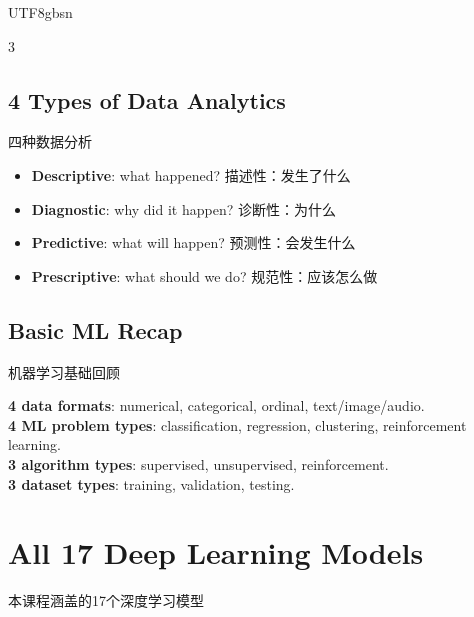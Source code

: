 \documentclass[9pt,landscape,a4paper]{article}
\newcommand{\zhint}[1]{{\scriptsize\color{gray!70!black}#1}}
\begin{document}
\begin{CJK}{UTF8}{gbsn}
\begin{multicols}{3}
\subsection{4 Types of Data Analytics}
\zhint{四种数据分析}
\begin{itemize}[leftmargin=8pt,itemsep=0pt,topsep=0pt]
\item \textbf{Descriptive}: what happened? \zhint{描述性：发生了什么}
\item \textbf{Diagnostic}: why did it happen? \zhint{诊断性：为什么}
\item \textbf{Predictive}: what will happen? \zhint{预测性：会发生什么}
\item \textbf{Prescriptive}: what should we do? \zhint{规范性：应该怎么做}
\end{itemize}

\subsection{Basic ML Recap}
\zhint{机器学习基础回顾}

\textbf{4 data formats}: numerical, categorical, ordinal, text/image/audio.\\
\textbf{4 ML problem types}: classification, regression, clustering, reinforcement learning.\\
\textbf{3 algorithm types}: supervised, unsupervised, reinforcement.\\
\textbf{3 dataset types}: training, validation, testing.

\section{All 17 Deep Learning Models}
\zhint{本课程涵盖的17个深度学习模型}


\end{multicols}
\end{CJK}
\end{document}
